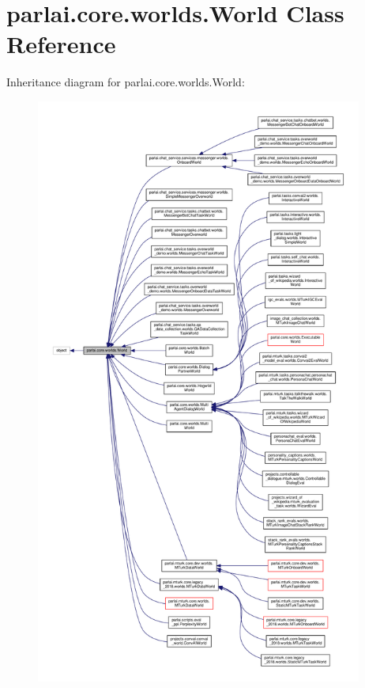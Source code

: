 \hypertarget{classparlai_1_1core_1_1worlds_1_1World}{}\section{parlai.\+core.\+worlds.\+World Class Reference}
\label{classparlai_1_1core_1_1worlds_1_1World}


Inheritance diagram for parlai.\+core.\+worlds.\+World\+:
\nopagebreak
\begin{figure}[H]
\begin{center}
\leavevmode
\includegraphics[height=550pt]{d5/db4/classparlai_1_1core_1_1worlds_1_1World__inherit__graph}
\end{center}
\end{figure}


